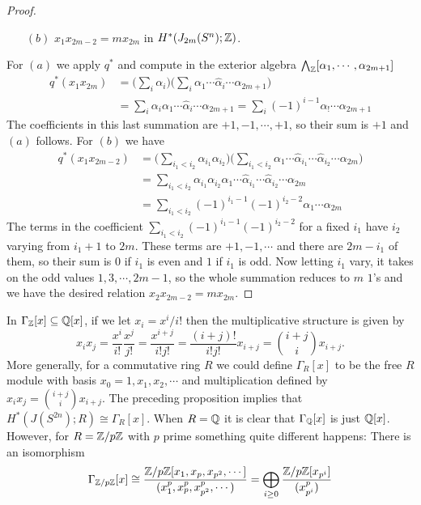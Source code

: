 \begin{proof}
\begin{itemize}
\item[$(b)$] $x_1x_{2m-2}=mx_{2m}$ in $H^*(J_{2m}(S^n);\mathbb{Z})$.
\end{itemize}
For $(a)$ we apply $q^*$ and compute in the exterior algebra $\bigwedge_{\mathbb{Z}}[\alpha_1,\cdots,\alpha_{2m+1}]$
\begin{align*}
q^*(x_1x_{2m})&=\Big(\sum_i\alpha_i\Big)\Big(\sum_{i}\alpha_1\cdots\widehat{\alpha}_{i}\cdots\alpha_{2m+1}\Big)\\
&=\sum_i\alpha_i\alpha_1\cdots\widehat{\alpha}_i\cdots\alpha_{2m+1}=\sum_i(-1)^{i-1}\alpha_!\cdots\alpha_{2m+1}
\end{align*}
The coefficients in this last summation are $+1,-1,\cdots,+1$, so their sum is $+1$ and $(a)$ follows. For $(b)$ we have
\begin{align*}
q^*(x_1x_{2m-2})&=\Big(\sum_{i_1<i_2}\alpha_{i_1}\alpha_{i_2}\Big)\Big(\sum_{i_1<i_2}\alpha_1\cdots\widehat{\alpha}_{i_1}\cdots\widehat{\alpha}_{i_2}\cdots\alpha_{2m}\Big)\\
&=\sum_{i_1<i_2}\alpha_{i_1}\alpha_{i_2}\alpha_1\cdots\widehat{\alpha}_{i_1}\cdots\widehat{\alpha}_{i_2}\cdots\alpha_{2m}\\
&=\sum_{i_1<i_2}(-1)^{i_1-1}(-1)^{i_2-2}\alpha_1\cdots\alpha_{2m}
\end{align*}
The terms in the coefficient $\sum_{i_1<i_2}(-1)^{i_1-1}(-1)^{i_2-2}$ for a fixed $i_1$ have $i_2$ varying from $i_1+1$ to $2m$. These terms are $+1,-1,\cdots$ and there are $2m-i_1$ of them, so their sum is $0$ if $i_1$ is even and $1$ if $i_1$ is odd. Now letting $i_1$ vary, it takes on the odd values $1,3,\cdots,2m-1$, so the whole summation reduces to $m$ $1$'s and we have the desired relation $x_2x_{2m-2}=mx_{2m}$.
\end{proof}
In $\Gamma_{\mathbb{Z}}[x]\subseteq\mathbb{Q}[x]$, if we let $x_i=x^i/i!$ then the multiplicative structure is given by 
\[x_ix_j=\frac{x^i}{i!}\frac{x^j}{j!}=\frac{x^{i+j}}{i!j!}=\frac{(i+j)!}{i!j!}x_{i+j}=\binom{i+j}{i}x_{i+j}.\]
More generally, for a commutative ring $R$ we could define $\Gamma_R[x]$ to be the free $R$ module with basis $x_0=1,x_1,x_2,\cdots$ and multiplication defined by $x_ix_j=\binom{i+j}{i}x_{i+j}$. The preceding proposition implies that $H^*(J(S^{2n});R)\cong\Gamma_R[x]$. When $R=\mathbb{Q}$ it is clear that $\Gamma_{\mathbb{Q}}[x]$ is just $\mathbb{Q}[x]$. However, for $R=\mathbb{Z}/p\mathbb{Z}$ with $p$ prime something quite different happens: There is an isomorphism
\[\Gamma_{\mathbb{Z}/p\mathbb{Z}}[x]\cong\frac{\mathbb{Z}/p\mathbb{Z}[x_1,x_p,x_{p^2},\cdots]}{(x_1^p,x_p^p,x_{p^2}^p,\cdots)}=\bigoplus_{i\geq 0}\frac{\mathbb{Z}/p\mathbb{Z}[x_{p^i}]}{(x_{p^i}^p)}\]
